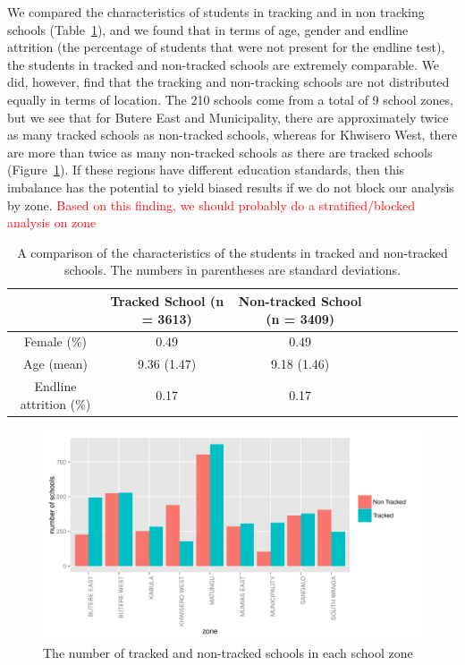 \documentclass[11pt]{article}
\begin{document}
 We compared the characteristics of students in tracking and in non tracking schools (Table~\ref{tab:char}), and we found that in terms of age, gender and endline attrition (the percentage of students that were not present for the endline test), the students in tracked and non-tracked schools are extremely comparable. We did, however, find that the tracking and non-tracking schools are not distributed equally in terms of location. The 210 schools come from a total of 9 school zones, but we see that for Butere East and Municipality, there are approximately twice as many tracked schools as non-tracked schools, whereas for Khwisero West, there are more than twice as many non-tracked schools as there are tracked schools (Figure~\ref{fig:zone}). If these regions have different education standards, then this imbalance has the potential to yield biased results if we do not block our analysis by zone. \textcolor{red}{Based on this finding, we should probably do a stratified/blocked analysis on zone}
 
 
 \begin{table}[H]
 \centering
 \begin{tabular}{cccccccccc}
 \hline
 & Tracked School (n = 3613) & Non-tracked School (n = 3409)\\
 \hline
Female (\%) & 0.49 & 0.49\\
Age (mean) & 9.36 (1.47) & 9.18 (1.46)\\
Endline attrition (\%) & 0.17 & 0.17\\ \hline
 \end{tabular}
 \caption{A comparison of the characteristics of the students in tracked and non-tracked schools. The numbers in parentheses are standard deviations.}
 \label{tab:char}
 \end{table} 
 
 \begin{figure}[H]
 \centering
 \includegraphics[scale = 0.5]{school_zones.pdf}
 \caption{The number of tracked and non-tracked schools in each school zone}
 \label{fig:zone}
 \end{figure}
 
\end{document}
